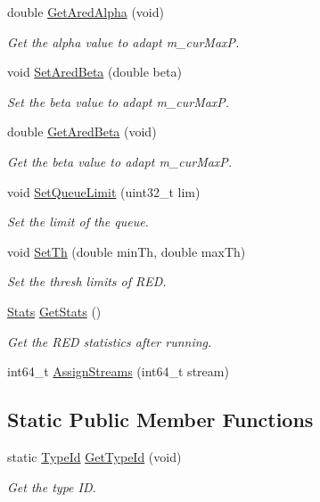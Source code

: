 \begin{DoxyCompactItemize}
double \hyperlink{classns3_1_1RedQueueDisc_adefdb5b123821bb0ee34221acdee4425}{Get\+Ared\+Alpha} (void)
\begin{DoxyCompactList}\small\item\em Get the alpha value to adapt m\+\_\+cur\+MaxP. \end{DoxyCompactList}\item 
void \hyperlink{classns3_1_1RedQueueDisc_a1afbf8c26f597bd39328710e393de5f1}{Set\+Ared\+Beta} (double beta)
\begin{DoxyCompactList}\small\item\em Set the beta value to adapt m\+\_\+cur\+MaxP. \end{DoxyCompactList}\item 
double \hyperlink{classns3_1_1RedQueueDisc_ac934d60cb050e331eaa4b1f1d2291561}{Get\+Ared\+Beta} (void)
\begin{DoxyCompactList}\small\item\em Get the beta value to adapt m\+\_\+cur\+MaxP. \end{DoxyCompactList}\item 
void \hyperlink{classns3_1_1RedQueueDisc_ab5348f5a688d4dff0602654f79d87477}{Set\+Queue\+Limit} (uint32\+\_\+t lim)
\begin{DoxyCompactList}\small\item\em Set the limit of the queue. \end{DoxyCompactList}\item 
void \hyperlink{classns3_1_1RedQueueDisc_a1c5c1f25cda04d2b92254ff908715bdf}{Set\+Th} (double min\+Th, double max\+Th)
\begin{DoxyCompactList}\small\item\em Set the thresh limits of R\+ED. \end{DoxyCompactList}\item 
\hyperlink{structns3_1_1RedQueueDisc_1_1Stats}{Stats} \hyperlink{classns3_1_1RedQueueDisc_a02fcef6a7f74f0b0b0408f415ec5a1f5}{Get\+Stats} ()
\begin{DoxyCompactList}\small\item\em Get the R\+ED statistics after running. \end{DoxyCompactList}\item 
int64\+\_\+t \hyperlink{classns3_1_1RedQueueDisc_a37e9660319f3c522f0767dcd974eb3c6}{Assign\+Streams} (int64\+\_\+t stream)
\end{DoxyCompactItemize}
\subsection*{Static Public Member Functions}
\begin{DoxyCompactItemize}
\item 
static \hyperlink{classns3_1_1TypeId}{Type\+Id} \hyperlink{classns3_1_1RedQueueDisc_a21c255fe1a7f38a3250af49ef1dac963}{Get\+Type\+Id} (void)
\begin{DoxyCompactList}\small\item\em Get the type ID. \end{DoxyCompactList}\end{DoxyCompactItemize}
